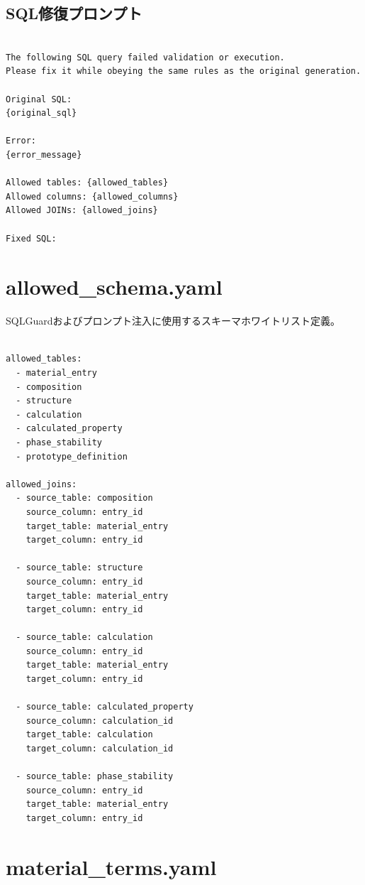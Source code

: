 \documentclass[3p]{elsarticle}
\begin{document}
\subsection{SQL修復プロンプト}
\begin{lstlisting}

The following SQL query failed validation or execution.
Please fix it while obeying the same rules as the original generation.

Original SQL:
{original_sql}

Error:
{error_message}

Allowed tables: {allowed_tables}
Allowed columns: {allowed_columns}
Allowed JOINs: {allowed_joins}

Fixed SQL:

\end{lstlisting}
\newpage

\section{allowed\_schema.yaml}
\label{sup:allowed_schema}

SQLGuardおよびプロンプト注入に使用するスキーマホワイトリスト定義。

\begin{lstlisting}

allowed_tables:
  - material_entry
  - composition
  - structure
  - calculation
  - calculated_property
  - phase_stability
  - prototype_definition

allowed_joins:
  - source_table: composition
    source_column: entry_id
    target_table: material_entry
    target_column: entry_id

  - source_table: structure
    source_column: entry_id
    target_table: material_entry
    target_column: entry_id

  - source_table: calculation
    source_column: entry_id
    target_table: material_entry
    target_column: entry_id

  - source_table: calculated_property
    source_column: calculation_id
    target_table: calculation
    target_column: calculation_id

  - source_table: phase_stability
    source_column: entry_id
    target_table: material_entry
    target_column: entry_id

\end{lstlisting}


\section{material\_terms.yaml}
\label{sup:material_terms}
\end{document}
